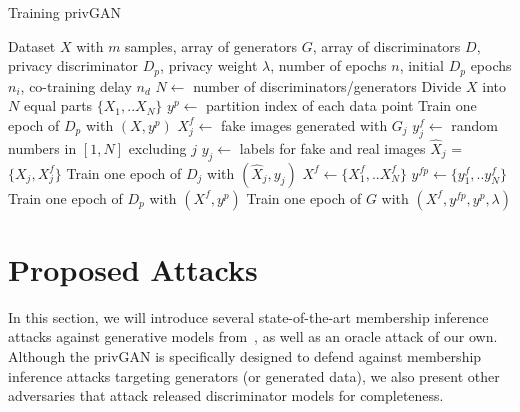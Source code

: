 \documentclass{article}
\begin{document}
\begin{algorithm}[!htb]
   \caption{Training privGAN}
   \label{alg:train}
\begin{algorithmic}
    Dataset $X$ with $m$ samples, array of generators $G$, array of discriminators $D$, privacy discriminator $D_p$, privacy weight $\lambda$, number of epochs $n$, initial $D_p$ epochs $n_i$, co-training delay $n_d$
   \STATE $N \gets$ number of discriminators/generators
   \STATE Divide $X$ into $N$ equal parts $\{X_1,..X_N\}$
   \STATE $y^p \gets$ partition index of each data point
   \STATE Train one epoch of $D_p$ with $(X,y^p)$
   \ENDFOR
   \STATE $X_j^f \gets$ fake images generated with $G_j$
   \STATE $y^f_j \gets$ random numbers in $[1,N]$ excluding $j$
   \STATE $y_j \gets$ labels for fake and real images
   \STATE $\hat{X}_j$ = $\{X_j,X_j^f\}$
   \STATE Train one epoch of $D_j$ with $(\hat{X}_j,y_j)$
   \ENDFOR
   \STATE $X^f \gets \{X^f_1,..X^f_N\}$
   \STATE $y^{fp} \gets \{y^f_1,..y^f_N\}$
   \STATE Train one epoch of $D_p$ with $(X^f,y^p)$
   \ENDIF
   \STATE Train one epoch of $G$ with $(X^f,y^{fp},y^p,\lambda)$
   \ENDFOR
\end{algorithmic}
\end{algorithm}

\section{Proposed Attacks}
\label{PropAttacks}
In this section, we will introduce several state-of-the-art membership inference attacks against generative models from~\cite{hilprecht2019monte,hayes2019logan},  as well as an oracle attack of our own. Although the privGAN is specifically designed to defend against membership inference attacks targeting generators (or generated data), we also present other adversaries that attack released discriminator models for completeness. 
\end{document}
